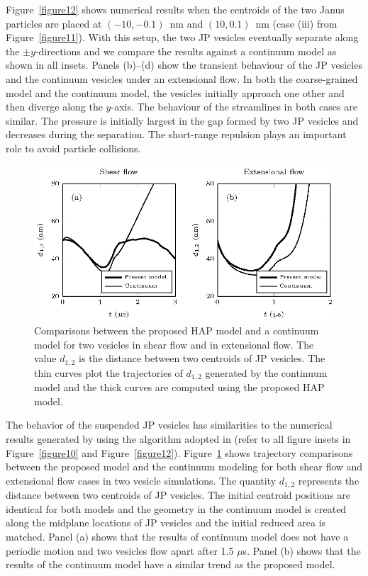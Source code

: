 \documentclass[lineno]{jfm}
\begin{document}
Figure~\ref{figure12} shows numerical results when the centroids of the
two Janus particles are placed at $(-10,-0.1)$~nm and $(10,0.1)$~nm
(case (iii) from Figure~\ref{figure11}). With this setup, the two JP
vesicles eventually separate along the $\pm y$-directions and we compare
the results against a continuum model as shown in all insets. Panels
(b)--(d) show the transient behaviour of the JP vesicles and the
continuum vesicles under an extensional flow. In both the coarse-grained
model and the continuum model, the vesicles initially approach
one other and then diverge along the $y$-axis. The behaviour of the
streamlines in both cases are similar. The pressure is initially largest
in the gap formed by two JP vesicles and decreases during the
separation. The short-range repulsion plays an important role to avoid
particle collisions.




\begin{figure}
  \centering
  \includegraphics[width=\textwidth]{fig13.eps}
  \caption{\label{figure13} Comparisons between the proposed HAP model and a continuum model
    for two vesicles in shear flow and in extensional flow.
  The value $d_{1,2}$ is the distance between two centroids of JP vesicles. The thin curves plot the trajectories
  of $d_{1,2}$ generated by the continuum model and the thick curves are computed using
  the proposed HAP model.}
\end{figure}


The behavior of the suspended JP vesicles has similarities to the numerical 
results generated by using the algorithm adopted in \cite{qua-vee-you2019} (refer to all figure
insets in Figure~\ref{figure10} and Figure~\ref{figure12}). Figure~\ref{figure13} shows 
trajectory comparisons between the proposed model and the continuum modeling for both 
shear flow and extensional flow cases in two vesicle simulations. The quantity $d_{1,2}$
represents the distance between two centroids of JP vesicles. The initial centroid positions are 
identical for both models and the geometry in the continuum model is created along the 
midplane locations of JP vesicles and the initial reduced area is matched. Panel (a) shows that 
the results of continuum model does not have a periodic motion and two vesicles flow apart 
after 1.5 $\mu$s. Panel (b) shows that the results of the continuum model have a similar trend as  the proposed model.
\end{document}
